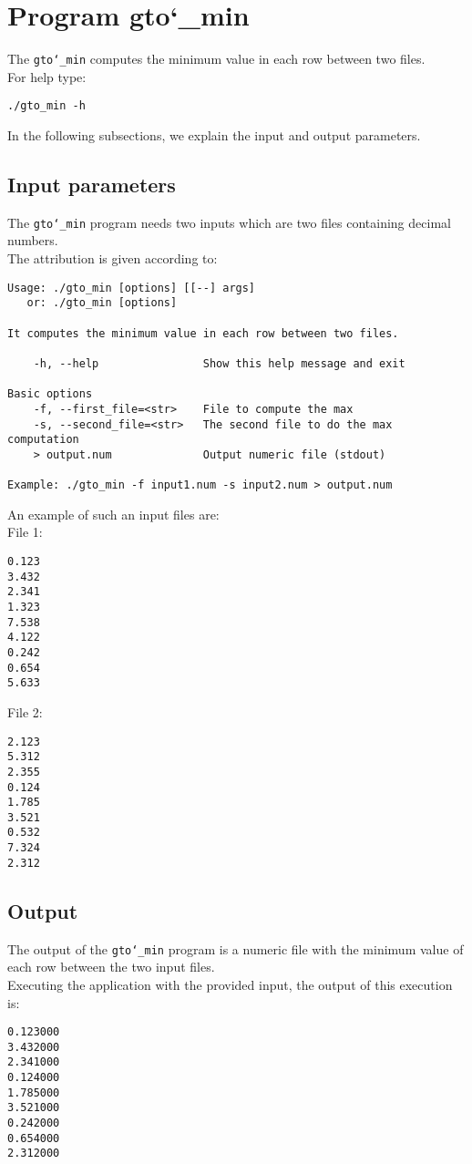\section{Program gto\char`_min}
The \texttt{gto\char`_min} computes the minimum value in each row between two files.\\
For help type:
\begin{lstlisting}
./gto_min -h
\end{lstlisting}
In the following subsections, we explain the input and output parameters.

\subsection*{Input parameters}

The \texttt{gto\char`_min}  program needs two inputs which are two files containing decimal numbers.\\
The attribution is given according to:
\begin{lstlisting}
Usage: ./gto_min [options] [[--] args]
   or: ./gto_min [options]

It computes the minimum value in each row between two files.

    -h, --help                Show this help message and exit

Basic options
    -f, --first_file=<str>    File to compute the max
    -s, --second_file=<str>   The second file to do the max computation
    > output.num              Output numeric file (stdout)

Example: ./gto_min -f input1.num -s input2.num > output.num
\end{lstlisting}
An example of such an input files are:\\
File 1:
\begin{lstlisting}
0.123
3.432
2.341
1.323
7.538
4.122
0.242
0.654
5.633
\end{lstlisting}
File 2:
\begin{lstlisting}
2.123
5.312
2.355
0.124
1.785
3.521
0.532
7.324
2.312
\end{lstlisting}

\subsection*{Output}
The output of the \texttt{gto\char`_min} program is a numeric file with the minimum value of each row between the two input files.\\
Executing the application with the provided input, the output of this execution is:
\begin{lstlisting}
0.123000
3.432000
2.341000
0.124000
1.785000
3.521000
0.242000
0.654000
2.312000
\end{lstlisting}